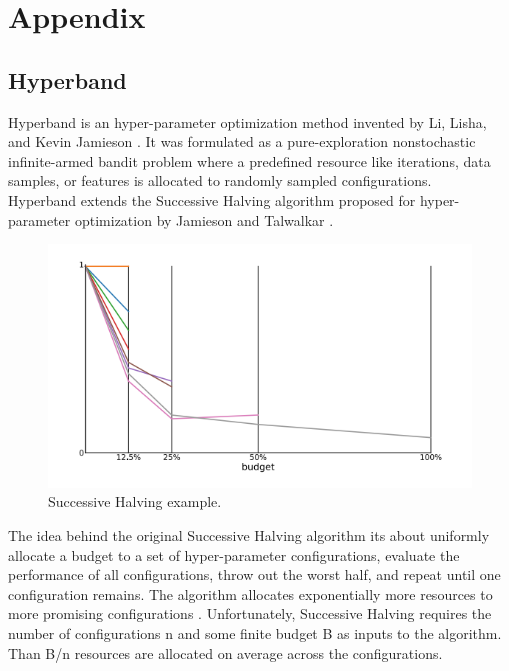 \section{Appendix}

\subsection{Hyperband}
    
Hyperband is an hyper-parameter optimization method invented by Li, Lisha, and Kevin Jamieson \cite{li2016novel}.
It was formulated as a pure-exploration nonstochastic infinite-armed bandit problem where a predefined resource like iterations, data samples, or features is allocated to randomly sampled configurations.\\

Hyperband extends the Successive Halving algorithm proposed for hyper-parameter optimization by Jamieson and Talwalkar \cite{jamieson2016non}. 

\begin{figure}[ht]
\centering
\includegraphics[scale=0.6]{images/Successive Halving.png}
\caption{Successive Halving example.}
\label{fig:Successive_Halving}
\end{figure}

The idea behind the original Successive Halving algorithm its about uniformly
allocate a budget to a set of hyper-parameter configurations, evaluate the performance of
all configurations, throw out the worst half, and repeat until one configuration remains.
The algorithm allocates exponentially more resources to more promising configurations \cite{li2016novel}\cite{jamieson2016non}.
Unfortunately, Successive Halving requires the number of configurations n and some finite budget B as inputs
to the algorithm. Than B/n resources are allocated on average across the configurations. 

